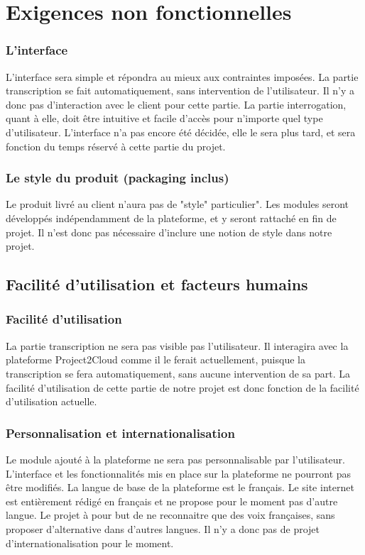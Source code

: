 		
	
	\chapter{Exigences non fonctionnelles}
			
	
		\subsection{L’interface}
		L'interface sera simple et répondra au mieux aux contraintes imposées. La partie transcription se fait automatiquement, sans intervention de l'utilisateur. Il n'y a donc pas d'interaction avec le client pour cette partie. La partie interrogation, quant à elle, doit être intuitive et facile d'accès pour n'importe quel type d'utilisateur. L'interface n'a pas encore été décidée, elle le sera plus tard, et sera fonction du temps réservé à cette partie du projet. 
	
		\subsection{Le style du produit (packaging inclus)}
		Le produit livré au client n'aura pas de "style" particulier". Les modules seront développés indépendamment de la plateforme, et y seront rattaché en fin de projet. Il n'est donc pas nécessaire d'inclure une notion de style dans notre projet.
	
	
	\section{Facilité d’utilisation et facteurs humains}
		\subsection{Facilité d’utilisation}
		La partie transcription ne sera pas visible pas l'utilisateur. Il interagira avec la plateforme Project2Cloud comme il le ferait actuellement, puisque la transcription se fera automatiquement, sans aucune intervention de sa part. La facilité d'utilisation de cette partie de notre projet est donc fonction de la facilité d'utilisation actuelle. 
		 
	
		\subsection{Personnalisation et internationalisation}
		Le module ajouté à la plateforme ne sera pas personnalisable par l'utilisateur. L'interface et les fonctionnalités mis en place sur la plateforme ne pourront pas être modifiés. 	
		La langue de base de la plateforme est le français. Le site internet est entièrement rédigé en français et ne propose pour le moment pas d'autre langue. Le projet à pour but de ne reconnaitre que des voix françaises, sans proposer d'alternative dans d'autres langues. Il n'y a donc pas de projet d'internationalisation pour le moment. 
	 
